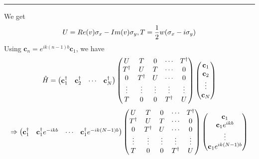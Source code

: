 \documentclass[letterpaper,10pt,english]{sphinxmanual}
\begin{document}
\bigskip\hrule{}\bigskip


We get
\begin{gather}
\begin{split}U=Re(v)\sigma_x-Im(v)\sigma_y,T=\frac{1}{2}w(\sigma_x-i\sigma_y)\end{split}\notag
\end{gather}
Using \(\mathbf{c}_n=e^{ik(n-1)b}\mathbf{c}_1\), we have
\begin{gather}
\begin{split}\hat{H}=\begin{pmatrix}\mathbf{c}_1^\dagger&\mathbf{c}_2^\dagger&\cdots&\mathbf{c}_N^\dagger \end{pmatrix}
\begin{pmatrix} U & T &0 & \cdots&T^\dagger\\
T^\dagger &U&T&\cdots&0\\
0&T^\dagger&U&\cdots&0\\
\vdots&\vdots&\vdots&\vdots&\vdots\\
T&0&0&T^\dagger&U
\end{pmatrix}
\begin{pmatrix}\mathbf{c}_1\\\mathbf{c}_2\\\vdots\\\mathbf{c}_N\end{pmatrix}\end{split}\notag
\end{gather}\begin{gather}
\begin{split}\Rightarrow \begin{pmatrix}\mathbf{c}_1^\dagger&\mathbf{c}_1^\dagger e^{-ikb}&\cdots&\mathbf{c}_1^\dagger e^{-ik(N-1)b} \end{pmatrix}
\begin{pmatrix} U & T &0 & \cdots&T^\dagger\\
T^\dagger &U&T&\cdots&0\\
0&T^\dagger&U&\cdots&0\\
\vdots&\vdots&\vdots&\vdots&\vdots\\
T&0&0&T^\dagger&U
\end{pmatrix}
\begin{pmatrix}\mathbf{c}_1\\\mathbf{c}_1 e^{ikb}\\\vdots\\\mathbf{c}_1e^{ik(N-1)b}\end{pmatrix}\end{split}\notag
\end{gather}
\end{document}
